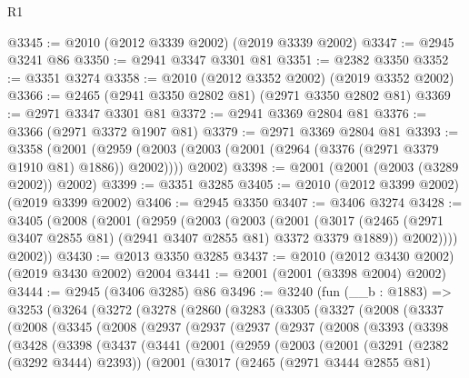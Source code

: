 \begin{lexlean}{R1}
\begin{coremodule}
@3345 := @2010 (@2012 @3339 @2002) (@2019 @3339 @2002)
@3347 := @2945 @3241 @86
@3350 := @2941 @3347 @3301 @81
@3351 := @2382 @3350
@3352 := @3351 @3274
@3358 := @2010 (@2012 @3352 @2002) (@2019 @3352 @2002)
@3366 := @2465 (@2941 @3350 @2802 @81) (@2971 @3350 @2802 @81)
@3369 := @2971 @3347 @3301 @81
@3372 := @2941 @3369 @2804 @81
@3376 := @3366 (@2971 @3372 @1907 @81)
@3379 := @2971 @3369 @2804 @81
@3393 := @3358
    (@2001
      (@2959 (@2003 (@2003 (@2001 (@2964 (@3376 (@2971 @3379 @1910 @81) @1886)) @2002))))
      @2002)
@3398 := @2001 (@2001 (@2003 (@3289 @2002)) @2002)
@3399 := @3351 @3285
@3405 := @2010 (@2012 @3399 @2002) (@2019 @3399 @2002)
@3406 := @2945 @3350
@3407 := @3406 @3274
@3428 := @3405
    (@2008
      (@2001
        (@2959
          (@2003
            (@2003
              (@2001
                (@3017 (@2465 (@2971 @3407 @2855 @81) (@2941 @3407 @2855 @81) @3372 @3379 @1889))
                @2002))))
        @2002))
@3430 := @2013 @3350 @3285
@3437 := @2010 (@2012 @3430 @2002) (@2019 @3430 @2002) @2004
@3441 := @2001 (@2001 (@3398 @2004) @2002)
@3444 := @2945 (@3406 @3285) @86
@3496 := @3240
    (fun (__b : @1883) =>
    @3253
      (@3264
        (@3272
          (@3278
            (@2860
              (@3283
                (@3305
                  (@3327
                    (@2008
                      (@3337
                        (@2008
                          (@3345
                            (@2008
                              (@2937
                                (@2937
                                  (@2937
                                    (@2937
                                      (@2008
                                        (@3393
                                          (@3398
                                            (@3428
                                              (@3398
                                                (@3437
                                                  (@3441
                                                    (@2001
                                                      (@2959
                                                        (@2003
                                                          (@2001
                                                            (@3291 (@2382 (@3292 @3444) @2393))
                                                            (@2001
                                                              (@3017
                                                                (@2465
                                                                  (@2971 @3444 @2855 @81)

\end{coremodule}
\end{lexlean}
